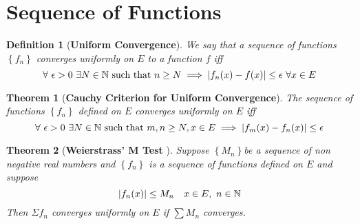 \documentclass{article}
\newcommand{\set}[1]{\left\{#1\right\}}
\newcommand{\abs}[1]{\left|#1\right|}
\newtheorem{theorem}{Theorem}[section]
\newtheorem{defn}{Definition}[section]
\begin{document}
\section {Sequence of Functions}
	\begin{defn}[\textbf{Uniform Convergence}]
		We say that a sequence of functions $\set{f_n}$ converges uniformly on $E$ to a function $f$ iff \[\forall \ \epsilon>0 \ \exists N\in \bbN \text{ such that }n\geq N \implies \abs{f_n(x)-f(x)}\leq \epsilon \ \forall x \in E\]
		 
	\end{defn}
\begin{theorem}[\textbf{Cauchy Criterion for Uniform Convergence}] 
	The sequence of functions $\set{f_n}$ defined on $E$ converges uniformly on $E$ iff \[\forall \ \epsilon>0 \ \exists N\in \bbN \text{ such that }m,n\geq N , x\in E \implies \abs{f_m(x)-f_n(x)}\leq \epsilon \]
\end{theorem}
\begin{theorem}[\textbf{Weierstrass' M Test} ]
	Suppose $\set{M_{n}}$be a sequence of non negative real numbers and $\set{f_n} $ is a sequence of functions  defined on $E$ and suppose \[\abs{f_n(x)}\leq M_n\quad x\in E, \ n\in \bbN\] Then $\Sigma f_n$ converges uniformly on $E$ if  $\sum{M_{n}}$ converges.
\end{theorem}
\end{document}
